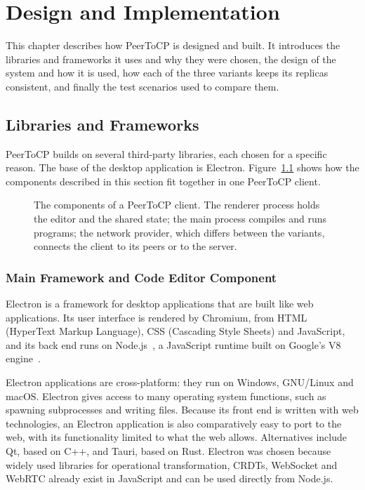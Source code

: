 \chapter{Design and Implementation}
\label{bab:4}

This chapter describes how PeerToCP is designed and built. It introduces the libraries and frameworks it uses and why they were chosen, the design of the system and how it is used, how each of the three variants keeps its replicas consistent, and finally the test scenarios used to compare them.

\section{Libraries and Frameworks}

PeerToCP builds on several third-party libraries, each chosen for a specific reason. The base of the desktop application is Electron. Figure~\ref{fig:4:components} shows how the components described in this section fit together in one PeerToCP client.

\begin{figure}[htbp]
    \centering
    
    \caption[The components of a PeerToCP client]{The components of a PeerToCP client. The renderer process holds the editor and the shared state; the main process compiles and runs programs; the network provider, which differs between the variants, connects the client to its peers or to the server.}
    \label{fig:4:components}
\end{figure}

\subsection{Main Framework and Code Editor Component}

Electron is a framework for desktop applications that are built like web applications. Its user interface is rendered by Chromium, from HTML (HyperText Markup Language), CSS (Cascading Style Sheets) and JavaScript, and its back end runs on Node.js~\citep{kredpattanakul2018transforming, miglanielectron}, a JavaScript runtime built on Google's V8 engine~\citep{tilkov2010node}.

Electron applications are cross-platform: they run on Windows, GNU/Linux and macOS. Electron gives access to many operating system functions, such as spawning subprocesses and writing files. Because its front end is written with web technologies, an Electron application is also comparatively easy to port to the web, with its functionality limited to what the web allows. Alternatives include Qt, based on C++, and Tauri, based on Rust. Electron was chosen because widely used libraries for operational transformation, CRDTs, WebSocket and WebRTC already exist in JavaScript and can be used directly from Node.js.

